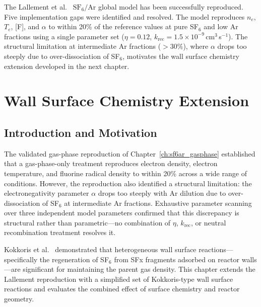 \documentclass[11pt,a4paper]{report}
\newcommand{\SFsix}{\mathrm{SF}_6}
\newcommand{\Ar}{\mathrm{Ar}}
\newcommand{\Te}{T_e}
\begin{document}
The Lallement et al.~\cite{Lallement2009} $\SFsix/\Ar$ global model has been successfully reproduced.  Five implementation gaps were identified and resolved.  The model reproduces $n_e$, $\Te$, [F], and $\alpha$ to within 20\% of the reference values at pure SF$_6$ and low Ar fractions using a single parameter set ($\eta = 0.12$, $k_\mathrm{rec} = 1.5 \times 10^{-9}$\,cm$^3$\,s$^{-1}$).  The structural limitation at intermediate Ar fractions ($>30\%$), where $\alpha$ drops too steeply due to over-dissociation of SF$_6$, motivates the wall surface chemistry extension developed in the next chapter.


\chapter{Wall Surface Chemistry Extension}
\label{ch:wallchem}

\section{Introduction and Motivation}
\label{sec:wall_intro}

The validated gas-phase reproduction of Chapter~\ref{ch:sf6ar_gasphase} established that a gas-phase-only treatment reproduces electron density, electron temperature, and fluorine radical density to within 20\% across a wide range of conditions.  However, the reproduction also identified a structural limitation: the electronegativity parameter $\alpha$ drops too steeply with Ar dilution due to over-dissociation of SF$_6$ at intermediate Ar fractions.  Exhaustive parameter scanning over three independent model parameters confirmed that this discrepancy is structural rather than parametric---no combination of $\eta$, $k_\mathrm{rec}$, or neutral recombination treatment resolves it.

Kokkoris et al.~\cite{Kokkoris2009} demonstrated that heterogeneous wall surface reactions---specifically the regeneration of SF$_6$ from SFx fragments adsorbed on reactor walls---are significant for maintaining the parent gas density.  This chapter extends the Lallement reproduction with a simplified set of Kokkoris-type wall surface reactions and evaluates the combined effect of surface chemistry and reactor geometry.
\end{document}
